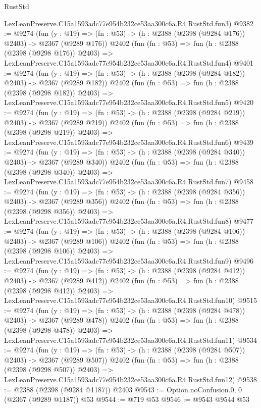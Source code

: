 \begin{lexlean}{RustStd}
\begin{coremodule}
    LexLeanPreserve.C15a1593adc77e954b232ce53aa300c6a.R4.RustStd.fun3)
@9382 := @9274
    (fun (y : @19) => (fn : @53) -> (h : @2388 (@2398 (@9284 @176)) @2403) -> @2367 (@9289 @176))
    @2402
    (fun (fn : @53) =>
    fun (h : @2388 (@2398 (@9298 @176)) @2403) =>
    LexLeanPreserve.C15a1593adc77e954b232ce53aa300c6a.R4.RustStd.fun4)
@9401 := @9274
    (fun (y : @19) => (fn : @53) -> (h : @2388 (@2398 (@9284 @182)) @2403) -> @2367 (@9289 @182))
    @2402
    (fun (fn : @53) =>
    fun (h : @2388 (@2398 (@9298 @182)) @2403) =>
    LexLeanPreserve.C15a1593adc77e954b232ce53aa300c6a.R4.RustStd.fun5)
@9420 := @9274
    (fun (y : @19) => (fn : @53) -> (h : @2388 (@2398 (@9284 @219)) @2403) -> @2367 (@9289 @219))
    @2402
    (fun (fn : @53) =>
    fun (h : @2388 (@2398 (@9298 @219)) @2403) =>
    LexLeanPreserve.C15a1593adc77e954b232ce53aa300c6a.R4.RustStd.fun6)
@9439 := @9274
    (fun (y : @19) => (fn : @53) -> (h : @2388 (@2398 (@9284 @340)) @2403) -> @2367 (@9289 @340))
    @2402
    (fun (fn : @53) =>
    fun (h : @2388 (@2398 (@9298 @340)) @2403) =>
    LexLeanPreserve.C15a1593adc77e954b232ce53aa300c6a.R4.RustStd.fun7)
@9458 := @9274
    (fun (y : @19) => (fn : @53) -> (h : @2388 (@2398 (@9284 @356)) @2403) -> @2367 (@9289 @356))
    @2402
    (fun (fn : @53) =>
    fun (h : @2388 (@2398 (@9298 @356)) @2403) =>
    LexLeanPreserve.C15a1593adc77e954b232ce53aa300c6a.R4.RustStd.fun8)
@9477 := @9274
    (fun (y : @19) => (fn : @53) -> (h : @2388 (@2398 (@9284 @106)) @2403) -> @2367 (@9289 @106))
    @2402
    (fun (fn : @53) =>
    fun (h : @2388 (@2398 (@9298 @106)) @2403) =>
    LexLeanPreserve.C15a1593adc77e954b232ce53aa300c6a.R4.RustStd.fun9)
@9496 := @9274
    (fun (y : @19) => (fn : @53) -> (h : @2388 (@2398 (@9284 @412)) @2403) -> @2367 (@9289 @412))
    @2402
    (fun (fn : @53) =>
    fun (h : @2388 (@2398 (@9298 @412)) @2403) =>
    LexLeanPreserve.C15a1593adc77e954b232ce53aa300c6a.R4.RustStd.fun10)
@9515 := @9274
    (fun (y : @19) => (fn : @53) -> (h : @2388 (@2398 (@9284 @478)) @2403) -> @2367 (@9289 @478))
    @2402
    (fun (fn : @53) =>
    fun (h : @2388 (@2398 (@9298 @478)) @2403) =>
    LexLeanPreserve.C15a1593adc77e954b232ce53aa300c6a.R4.RustStd.fun11)
@9534 := @9274
    (fun (y : @19) => (fn : @53) -> (h : @2388 (@2398 (@9284 @507)) @2403) -> @2367 (@9289 @507))
    @2402
    (fun (fn : @53) =>
    fun (h : @2388 (@2398 (@9298 @507)) @2403) =>
    LexLeanPreserve.C15a1593adc77e954b232ce53aa300c6a.R4.RustStd.fun12)
@9538 := @2388 (@2398 (@9284 @1187)) @2403
@9543 := Option.noConfusion.{0, 0} (@2367 (@9289 @1187)) @53
@9544 := @719 @53
@9546 := @9543 @9544 @53

\end{coremodule}
\end{lexlean}
